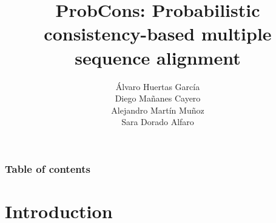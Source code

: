 \documentclass[11pt]{beamer}
\title[ProbCons]{ProbCons: Probabilistic consistency-based multiple sequence alignment}
\author[Group 5]{Álvaro Huertas García \\ Diego Mañanes Cayero
                 \\ Alejandro Martín Muñoz \\ Sara Dorado Alfaro}
\begin{document}
\frame{\titlepage}
\begin{frame}
    \frametitle{Table of contents}
    \tableofcontents
\end{frame}

\section{Introduction} 


\frame{\titlepage}
\end{document}
